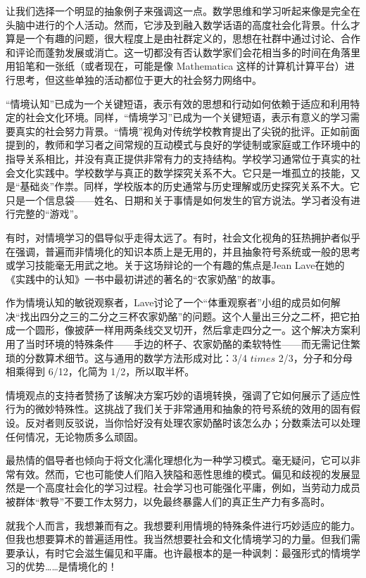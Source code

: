 让我们选择一个明显的抽象例子来强调这一点。数学思维和学习听起来像是完全在头脑中进行的个人活动。然而，它涉及到融入数学话语的高度社会化背景。什么才算是一个有趣的问题，很大程度上是由社群定义的，思想在社群中通过讨论、合作和评论而蓬勃发展或消亡。这一切都没有否认数学家们会花相当多的时间在角落里用铅笔和一张纸（或者现在，可能是像 Mathematica 这样的计算机计算平台）进行思考，但这些单独的活动都位于更大的社会努力网络中。

“情境认知”已成为一个关键短语，表示有效的思想和行动如何依赖于适应和利用特定的社会文化环境。同样，“情境学习”已成为一个关键短语，表示有意义的学习需要真实的社会努力背景。“情境”视角对传统学校教育提出了尖锐的批评。正如前面提到的，教师和学习者之间常规的互动模式与良好的学徒制或家庭或工作环境中的指导关系相比，并没有真正提供非常有力的支持结构。学校学习通常位于真实的社会文化实践中。学校数学与真正的数学探究关系不大。它只是一堆孤立的技能，又是“基础炎”作祟。同样，学校版本的历史通常与历史理解或历史探究关系不大。它只是一个信息袋——姓名、日期和关于事情是如何发生的官方说法。学习者没有进行完整的“游戏”。

有时，对情境学习的倡导似乎走得太远了。有时，社会文化视角的狂热拥护者似乎在强调，普遍而非情境化的知识本质上是无用的，并且抽象符号系统或一般的思考或学习技能毫无用武之地。关于这场辩论的一个有趣的焦点是Jean Lave在她的《实践中的认知》一书中最初讲述的著名的“农家奶酪”的故事。

作为情境认知的敏锐观察者，Lave讨论了一个“体重观察者”小组的成员如何解决“找出四分之三的二分之三杯农家奶酪”的问题。这个人量出三分之二杯，把它拍成一个圆形，像披萨一样用两条线交叉切开，然后拿走四分之一。这个解决方案利用了当时环境的特殊条件——手边的杯子、农家奶酪的柔软特性——而无需记住繁琐的分数算术细节。这与通用的数学方法形成对比：3/4 $times$ 2/3，分子和分母相乘得到 6/12，化简为 1/2，所以取半杯。

情境观点的支持者赞扬了该解决方案巧妙的语境转换，强调了它如何展示了适应性行为的微妙特殊性。这挑战了我们关于非常通用和抽象的符号系统的效用的固有假设。反对者则反驳说，当你恰好没有处理农家奶酪时该怎么办；分数乘法可以处理任何情况，无论物质多么顽固。

最热情的倡导者也倾向于将文化濡化理想化为一种学习模式。毫无疑问，它可以非常有效。然而，它也可能使人们陷入狭隘和恶性思维的模式。偏见和歧视的发展显然是一个高度社会化的学习过程。社会学习也可能强化平庸，例如，当劳动力成员被群体“教导”不要工作太努力，以免最终暴露人们的真正生产力有多高时。

就我个人而言，我想兼而有之。我想要利用情境的特殊条件进行巧妙适应的能力。但我也想要算术的普遍适用性。我当然想要社会和文化情境学习的力量。但我们需要承认，有时它会滋生偏见和平庸。也许最根本的是一种讽刺：最强形式的情境学习的优势……是情境化的！

